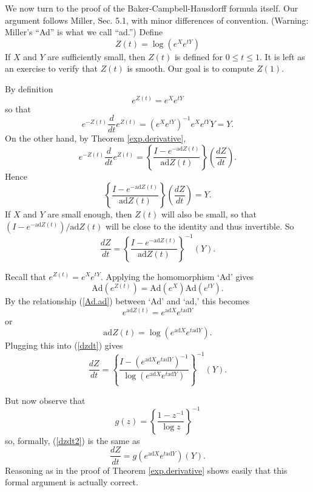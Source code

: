 \documentclass{amsbook}
\theoremstyle{plain}
\numberwithin{equation}{chapter}
\numberwithin{theorem}{chapter}
\begin{document}
We now turn to the proof of the Baker-Campbell-Hausdorff formula itself. Our
argument follows Miller, Sec. 5.1, with minor differences of convention.
(Warning: Miller's ``Ad'' is what we call ``ad.'') Define
\[
Z(t)=\log\left(  e^{X}e^{tY}\right)
\]
If $X$ and $Y$ are sufficiently small, then $Z\left(  t\right)  $ is defined
for $0\leq t\leq1$. It is left as an exercise to verify that $Z(t)$ is smooth.
Our goal is to compute $Z(1).$

By definition
\[
e^{Z(t)}=e^{X}e^{tY}%
\]
so that
\[
e^{-Z(t)}\frac d{dt}e^{Z(t)}=\left(  e^{X}e^{tY}\right)  ^{-1}e^{X}%
e^{tY}Y=Y\text{.}%
\]
On the other hand, by Theorem \ref{exp.derivative},
\[
e^{-Z(t)}\frac d{dt}e^{Z(t)}=\left\{  \frac{I-e^{-\mathrm{ad}Z(t)}%
}{\mathrm{ad}Z(t)}\right\}  \left(  \frac{dZ}{dt}\right)  \text{.}%
\]
Hence
\[
\left\{  \frac{I-e^{-\mathrm{ad}Z(t)}}{\mathrm{ad}Z(t)}\right\}  \left(
\frac{dZ}{dt}\right)  =Y\text{.}%
\]
If $X$ and $Y$ are small enough, then $Z(t)$ will also be small, so that
$\left(  I-e^{-\mathrm{ad}Z(t)}\right)  /\mathrm{ad}Z(t)$ will be close to the
identity and thus invertible. So
\begin{equation}
\frac{dZ}{dt}=\left\{  \frac{I-e^{-\mathrm{ad}Z(t)}}{\mathrm{ad}Z(t)}\right\}
^{-1}(Y)\text{.}\label{dzdt}%
\end{equation}

Recall that $e^{Z(t)}=e^{X}e^{tY}$. Applying the homomorphism `Ad' gives
\[
\mathrm{Ad}\left(  e^{Z(t)}\right)  =\mathrm{Ad}\left(  e^{X}\right)
\mathrm{Ad}\left(  e^{tY}\right)  \text{.}%
\]
By the relationship (\ref{Ad.ad}) between `Ad' and `ad,' this becomes
\[
e^{\mathrm{ad}Z(t)}=e^{\mathrm{ad}X}e^{t\mathrm{ad}Y}%
\]
or
\[
\mathrm{ad}Z(t)=\log\left(  e^{\mathrm{ad}X}e^{t\mathrm{ad}Y}\right)  \text{.}%
\]
Plugging this into (\ref{dzdt}) gives
\begin{equation}
\frac{dZ}{dt}=\left\{  \frac{I-\left(  e^{\mathrm{ad}X}e^{t\mathrm{ad}%
Y}\right)  ^{-1}}{\log\left(  e^{\mathrm{ad}X}e^{t\mathrm{ad}Y}\right)
}\right\}  ^{-1}(Y)\text{.}\label{dzdt2}%
\end{equation}

But now observe that
\[
g(z)=\left\{  \frac{1-z^{-1}}{\log z}\right\}  ^{-1}%
\]
so, formally, (\ref{dzdt2}) is the same as
\begin{equation}
\frac{dZ}{dt}=g\left(  e^{\mathrm{ad}X}e^{t\mathrm{ad}Y}\right)
(Y)\text{.}\label{dzdt3}%
\end{equation}
Reasoning as in the proof of Theorem \ref{exp.derivative} shows easily that
this formal argument is actually correct.
\end{document}
